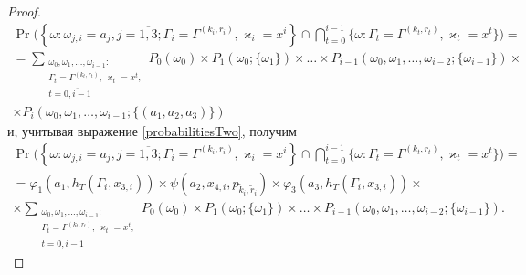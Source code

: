 \documentclass{report}
\begin{document}
\begin{proof}
\begin{multline*}
\Pr\biggl( \left\{ \omega \colon \omega_{j,i} = a_j,j=\overline{1,3}; \Gamma_i=\Gamma^{(k_i,r_i)}, \varkappa_i=x^i\right\} \cap \bigcap_{t=0}^{i-1}\{\omega\colon \Gamma_t=\Gamma^{(k_t,r_t)}, \varkappa_t=x^t\}\biggr) 
= \\ =\sum_{\substack{\omega_0, \omega_1,\ldots, \omega_{i-1} \colon \\ \Gamma_t=\Gamma^{(k_t,r_t)},\, \varkappa_t=x^t, \\ t=\overline{0,i-1}}} P_0(\omega_0)\times P_1(\omega_0;\{\omega_1\})\times\ldots \times P_{i-1}(\omega_0,\omega_1,\ldots, \omega_{i-2};\{\omega_{i-1}\})
\times \\[-2ex] \times P_i(\omega_0,\omega_1,\ldots, \omega_{i-1};\{(a_1, a_2, a_3)\})
\end{multline*}
и, учитывая выражение \eqref{probabilitiesTwo}, получим
\begin{multline}
\Pr\biggl( \left\{ \omega \colon \omega_{j,i} = a_j, j=\overline{1,3}; \Gamma_i=\Gamma^{(k_i,r_i)}, \varkappa_i=x^i\right\} \cap \bigcap_{t=0}^{i-1}\{\omega\colon \Gamma_t=\Gamma^{(k_t,r_t)}, \varkappa_t=x^t\}\biggr) 
=\\=\varphi_1(a_1,h_T(\Gamma_i,x_{3,i})) \times \psi(a_2,x_{4,i}, p_{\tilde{k}_i,\tilde{r}_i}) \times  \varphi_3(a_3,h_T(\Gamma_i,x_{3,i}))
\times \\ \times \sum_{\substack{\omega_0, \omega_1,\ldots, \omega_{i-1} \colon \\ \Gamma_t=\Gamma^{(k_t,r_t)},\, \varkappa_t=x^t,\\ t=\overline{0,i-1}}} P_0(\omega_0)\times P_1(\omega_0;\{\omega_1\})\times \ldots \times P_{i-1}(\omega_0,\omega_1,\ldots, \omega_{i-2};\{\omega_{i-1}\}).
\label{Construction:4}
\end{multline}


\end{proof}
\end{document}

